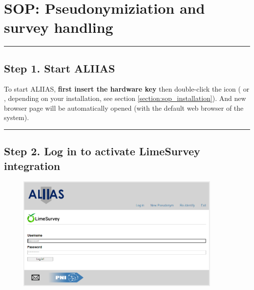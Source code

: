 \pagebreak
\section{SOP: Pseudonymiziation and survey handling}
\label{section:sop_aliias}

\par\noindent\rule{\textwidth\color{pniblue}}{0.4pt}
\subsection*{Step 1. Start ALIIAS}

To start ALIIAS, \textbf{first insert the hardware key} then double-click the  icon ( or , depending on your installation, see section \ref{section:sop_installation}). And new browser page will be automatically opened (with the default web browser of the system).

\small\setlength\fboxsep{5pt}\setlength\fboxrule{1pt}

\par\noindent\rule{\textwidth\color{pniblue}}{0.4pt}
\subsection*{Step 2. Log in to activate LimeSurvey integration}

\begin{figure}[H]
\includegraphics[width=0.9\textwidth]{docs/fig/01_login.PNG}
\end{figure}

